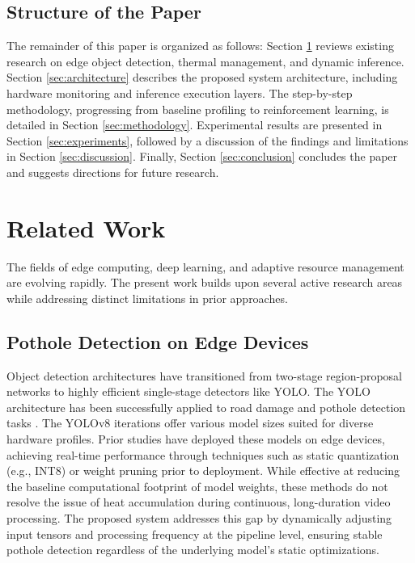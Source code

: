\documentclass{ieeeaccess}
\begin{document}
\subsection{Structure of the Paper}
The remainder of this paper is organized as follows: Section \ref{sec:related_work} reviews existing research on edge object detection, thermal management, and dynamic inference. Section \ref{sec:architecture} describes the proposed system architecture, including hardware monitoring and inference execution layers. The step-by-step methodology, progressing from baseline profiling to reinforcement learning, is detailed in Section \ref{sec:methodology}. Experimental results are presented in Section \ref{sec:experiments}, followed by a discussion of the findings and limitations in Section \ref{sec:discussion}. Finally, Section \ref{sec:conclusion} concludes the paper and suggests directions for future research.

\section{Related Work}
\label{sec:related_work}
The fields of edge computing, deep learning, and adaptive resource management are evolving rapidly. The present work builds upon several active research areas while addressing distinct limitations in prior approaches.

\subsection{Pothole Detection on Edge Devices}
Object detection architectures have transitioned from two-stage region-proposal networks to highly efficient single-stage detectors like YOLO. The YOLO architecture has been successfully applied to road damage and pothole detection tasks \cite{b1, b2, b9, b10}. The YOLOv8 iterations offer various model sizes suited for diverse hardware profiles. Prior studies \cite{b11, b12} have deployed these models on edge devices, achieving real-time performance through techniques such as static quantization (e.g., INT8) or weight pruning prior to deployment. While effective at reducing the baseline computational footprint of model weights, these methods do not resolve the issue of heat accumulation during continuous, long-duration video processing. The proposed system addresses this gap by dynamically adjusting input tensors and processing frequency at the pipeline level, ensuring stable pothole detection regardless of the underlying model's static optimizations.
\end{document}
